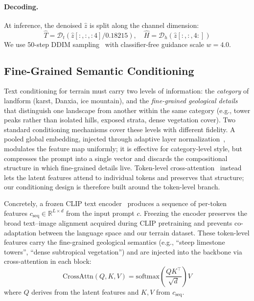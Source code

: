 \documentclass[review]{vgtc}                 %
\begin{document}
\paragraph{Decoding.}
At inference, the denoised $\hat{z}$ is split along the channel dimension:
\begin{equation}
  \hat{T} = \mathcal{D}_t(\hat{z}[:, :, :4] / 0.18215), \quad \hat{H} = \mathcal{D}_h(\hat{z}[:, :, 4:])
  \label{eq:decode}
\end{equation}
We use 50-step DDIM sampling~\cite{DDIM:2022} with classifier-free guidance scale $w = 4.0$.

\subsection{Fine-Grained Semantic Conditioning}
\label{sec:conditioning}

Text conditioning for terrain must carry two levels of information: the \emph{category} of landform (karst, Danxia, ice mountain), and the \emph{fine-grained geological details} that distinguish one landscape from another within the same category (e.g., tower peaks rather than isolated hills, exposed strata, dense vegetation cover).
Two standard conditioning mechanisms cover these levels with different fidelity.
A pooled global embedding, injected through adaptive layer normalization~\cite{DiT:2023,PixArt:2024}, modulates the feature map uniformly; it is effective for category-level style, but compresses the prompt into a single vector and discards the compositional structure in which fine-grained details live.
Token-level cross-attention~\cite{LDM:2022,SDXL:2024} instead lets the latent features attend to individual tokens and preserves that structure; our conditioning design is therefore built around the token-level branch.

Concretely, a frozen CLIP text encoder~\cite{CLIP:2021} produces a sequence of per-token features $c_{\text{seq}} \in \mathbb{R}^{L \times d}$ from the input prompt $c$.
Freezing the encoder preserves the broad text--image alignment acquired during CLIP pretraining and prevents co-adaptation between the language space and our terrain dataset.
These token-level features carry the fine-grained geological semantics (e.g., ``steep limestone towers'', ``dense subtropical vegetation'') and are injected into the backbone via cross-attention in each block:
\begin{equation}
  \text{CrossAttn}(Q, K, V) = \text{softmax}\!\left(\frac{Q K^\top}{\sqrt{d}}\right) V
  \label{eq:cross_attn}
\end{equation}
where $Q$ derives from the latent features and $K, V$ from $c_{\text{seq}}$.
\end{document}

